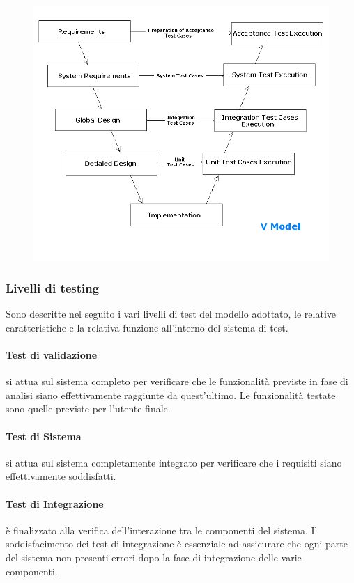 \documentclass[12pt,a4paper]{article}
\begin{document}
\begin{figure}[h]
	\centering
	\includegraphics[width=0.9\linewidth]{../img/v-model}
	\caption[V Model]{}
	\label{fig:v-model}
\end{figure}

\subsubsection{Livelli di testing}
Sono descritte nel seguito i vari livelli di test del modello adottato, le relative caratteristiche e la relativa funzione all'interno del sistema di test. 

\paragraph{Test di validazione} si attua sul sistema completo per verificare che le funzionalità previste in fase di analisi siano effettivamente raggiunte da quest'ultimo. Le funzionalità testate sono quelle previste per l'utente finale.

\paragraph{Test di Sistema} si attua sul sistema completamente integrato per verificare che i requisiti siano effettivamente soddisfatti.

\paragraph{Test di Integrazione} è finalizzato alla verifica dell'interazione tra le componenti del sistema. Il soddisfacimento dei test di integrazione è essenziale ad assicurare che ogni parte del sistema non presenti errori dopo la fase di integrazione delle varie componenti.
\end{document}
